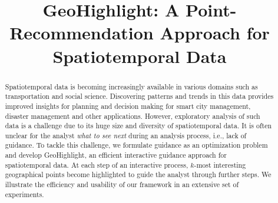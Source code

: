 \documentclass{sig-alternate-05-2015}
\begin{document}




\newtheorem{problem}{Problem}
\newtheorem{definition}{Definition}
\newtheorem{example}{Example}

\newcommand{\framework}{{\sc GeoHighlight}}
\newcommand{\pb}{{\sc GeoGuide}}

 





\title{GeoHighlight: A Point-Recommendation Approach for Spatiotemporal Data}





\maketitle
\begin{abstract}
Spatiotemporal data is becoming increasingly available in various domains such as transportation and social science. Discovering patterns and trends in this data provides improved insights for planning and decision making for smart city management, disaster management and other applications. However, exploratory analysis of such data is a challenge due to its huge size and diversity of spatiotemporal data. It is often unclear for the analyst {\em what to see next} during an analysis process, i.e., lack of guidance. To tackle this challenge, we formulate guidance as an optimization problem and develop \framework, an efficient interactive guidance approach for spatiotemporal data. At each step of an interactive process, $k$-most interesting geographical points become highlighted to guide the analyst through further steps. We illustrate the efficiency and usability of our framework in an extensive set of experiments.
\end{abstract}








% 




 
\end{document}
